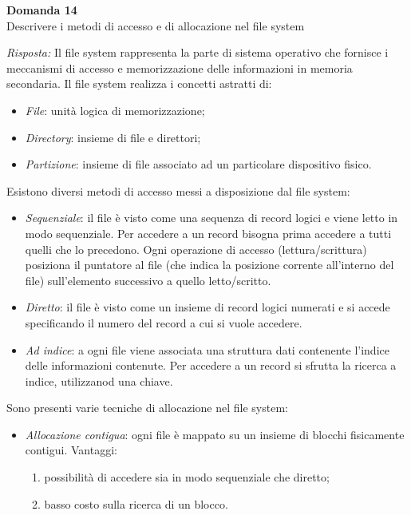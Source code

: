 \documentclass{article}
\newenvironment{problem}[2][Domanda]
    { \begin{mdframed}[backgroundcolor=gray!20] \textbf{#1 #2} \\}
    {  \end{mdframed}}
\newenvironment{solution}
    {\textit{Risposta:}}
    {}
\begin{document}
\begin{problem}{14}
Descrivere i metodi di accesso e di allocazione nel file system
\end{problem}
\begin{solution}
Il file system rappresenta la parte di sistema operativo che fornisce i meccanismi di accesso e memorizzazione delle informazioni in memoria secondaria.
\newline
Il file system realizza i concetti astratti di:
\begin{itemize}
    \item \emph{File}: unità logica di memorizzazione;
    \item \emph{Directory}: insieme di file e direttori;
    \item \emph{Partizione}: insieme di file associato ad un particolare dispositivo fisico.
\end{itemize}
Esistono diversi metodi di accesso messi a disposizione dal file system:
\begin{itemize}
    \item \emph{Sequenziale}: il file è visto come una sequenza di record logici e viene letto in modo sequenziale. Per accedere a un record bisogna prima accedere a tutti quelli che lo precedono. Ogni operazione di accesso (lettura/scrittura) posiziona il puntatore al file (che indica la posizione corrente all’interno del file) sull’elemento successivo a quello letto/scritto. 
    \item \emph{Diretto}: il file è visto come un insieme di record logici numerati e si accede specificando il numero del record a cui si vuole accedere.
    \item \emph{Ad indice}: a ogni file viene associata una struttura dati contenente l’indice delle informazioni contenute. Per accedere a un record si sfrutta la ricerca a indice, utilizzanod una chiave. 
\end{itemize} 
Sono presenti varie tecniche di allocazione nel file system:
\begin{itemize}
    \item  \emph{Allocazione contigua}: ogni file è mappato su un insieme di blocchi fisicamente contigui.
    \newline
    \newline
    Vantaggi:
    \begin{enumerate}
        \item possibilità di accedere sia in modo sequenziale che diretto;
        \item  basso costo sulla ricerca di un blocco.

\end{enumerate}
\end{itemize}
\end{solution}
\end{document}
